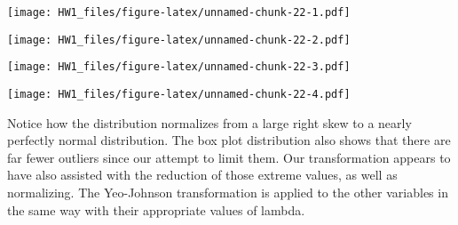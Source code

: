 \documentclass[
]{article}
\newenvironment{Shaded}{\begin{snugshade}}{\end{snugshade}}
\newcommand{\AttributeTok}[1]{\textcolor[rgb]{0.77,0.63,0.00}{#1}}
\newcommand{\FunctionTok}[1]{\textcolor[rgb]{0.00,0.00,0.00}{#1}}
\newcommand{\NormalTok}[1]{#1}
\newcommand{\SpecialCharTok}[1]{\textcolor[rgb]{0.00,0.00,0.00}{#1}}
\newcommand{\StringTok}[1]{\textcolor[rgb]{0.31,0.60,0.02}{#1}}
\begin{document}
\texttt{[image: HW1\_files/figure-latex/unnamed-chunk-22-1.pdf]}

\begin{Shaded}
\end{Shaded}

\texttt{[image: HW1\_files/figure-latex/unnamed-chunk-22-2.pdf]}

\begin{Shaded}
\end{Shaded}

\texttt{[image: HW1\_files/figure-latex/unnamed-chunk-22-3.pdf]}

\begin{Shaded}
\end{Shaded}

\texttt{[image: HW1\_files/figure-latex/unnamed-chunk-22-4.pdf]}

Notice how the distribution normalizes from a large right skew to a
nearly perfectly normal distribution. The box plot distribution also
shows that there are far fewer outliers since our attempt to limit them.
Our transformation appears to have also assisted with the reduction of
those extreme values, as well as normalizing. The Yeo-Johnson
transformation is applied to the other variables in the same way with
their appropriate values of lambda.
\end{document}
